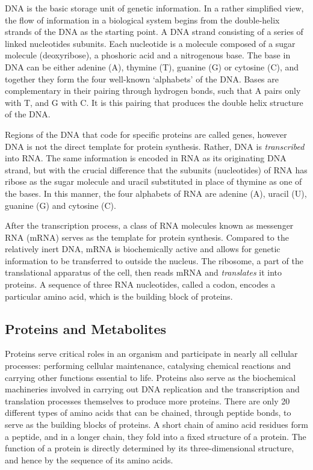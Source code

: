DNA is the basic storage unit of genetic information. In a rather simplified view, the flow of information in a biological system begins from the double-helix strands of the DNA as the starting point. A DNA strand consisting of a series of linked nucleotides subunits. Each nucleotide is a molecule composed of a sugar molecule (deoxyribose), a phoshoric acid and a nitrogenous base. The base in DNA can be either adenine (A), thymine (T), guanine (G) or cytosine (C), and together they form the four well-known `alphabets' of the DNA. Bases are complementary in their pairing through hydrogen bonds, such that A pairs only with T, and G with C. It is this pairing that produces the double helix structure of the DNA. 

Regions of the DNA that code for specific proteins are called genes, however DNA is not the direct template for protein synthesis. Rather, DNA is \emph{transcribed} into RNA. The same information is encoded in RNA as its originating DNA strand, but with the crucial difference that the subunits (nucleotides) of RNA has ribose as the sugar molecule and uracil substituted in place of thymine as one of the bases. In this manner, the four alphabets of RNA are adenine (A), uracil (U), guanine (G) and cytosine (C). 

After the transcription process, a class of RNA molecules known as messenger RNA (mRNA) serves as the template for protein synthesis. Compared to the relatively inert DNA, mRNA is biochemically active and allows for genetic information to be transferred to outside the nucleus. The ribosome, a part of the translational apparatus of the cell, then reads mRNA and \emph{translates} it into proteins. A sequence of three RNA nucleotides, called a codon, encodes a particular amino acid, which is the building block of proteins. 

\subsection{Proteins and Metabolites}

Proteins serve critical roles in an organism and participate in nearly all cellular processes: performing cellular maintenance, catalysing chemical reactions and carrying other functions essential to life. Proteins also serve as the biochemical machineries involved in carrying out DNA replication and the transcription and translation processes themselves to produce more proteins. There are only 20 different types of amino acids that can be chained, through peptide bonds, to serve as the building blocks of proteins. A short chain of amino acid residues form a peptide, and in a longer chain, they fold into a fixed structure of a protein. The function of a protein is directly determined by its three-dimensional structure, and hence by the sequence of its amino acids. 

